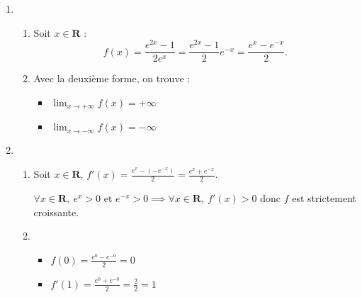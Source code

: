 \documentclass[12pt,a4paper,french]{article}
\newcommand{\R}{\mathbf{R}}
\theoremstyle{break}
\theoremstyle{plain}
\theoremstyle{nonumberplain}
\theoremstyle{nonumberbreak}
\begin{document}
\begin{solution}
  \begin{enumerate}
    \item \begin{enumerate}
        \item Soit $x\in\R$ : \[f(x) = \frac{e^{2x} - 1}{2e^x} =
          \frac{e^{2x} - 1}{2}e^{-x} = \frac{e^x - e^{-x}}2.\]
        \item Avec la deuxième forme, on trouve :
          \begin{itemize}
            \item $\lim_{x\to+\infty}f(x) = +\infty$
            \item $\lim_{x\to-\infty}f(x) = -\infty$
          \end{itemize}
      \end{enumerate}
    \item \begin{enumerate}
        \item Soit $x \in \R$, $f'(x) = \frac{e^x -(-e^{-x})}2 =
          \frac{e^x + e^{-x}}2.$

          $\forall x\in\R,\ e^x > 0$ et $e^{-x} > 0 \implies \forall
          x\in \R,\ f'(x) > 0$ donc $f$ est strictement croissante.
        \item
          \begin{itemize}
            \item $f(0) = \frac{e^0 - e^{-0}}2 = 0$
            \item $f'(1) = \frac{e^0 + e^{-0}}2 = \frac22 = 1$
          \end{itemize}
      \end{enumerate}
  \end{enumerate}
\end{solution}
\end{document}
